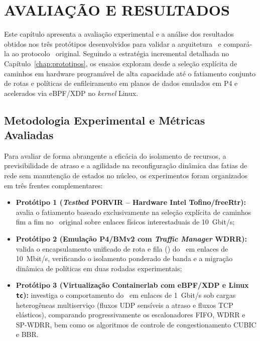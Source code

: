 \chapter{AVALIAÇÃO E RESULTADOS}
\label{chap:avaliacao}

Este capítulo apresenta a avaliação experimental e a análise dos resultados obtidos nos três protótipos desenvolvidos para validar a arquitetura \nome\ e compará-la ao protocolo \polka\ original. Seguindo a estratégia incremental detalhada no Capítulo~\ref{chap:prototipos}, os ensaios exploram desde a seleção explícita de caminhos em hardware programável de alta capacidade até o fatiamento conjunto de rotas e políticas de enfileiramento em planos de dados emulados em P4 e acelerados via eBPF/XDP no \textit{kernel} Linux.

\section{Metodologia Experimental e Métricas Avaliadas}
\label{sec:metodologia_avaliacao}

Para avaliar de forma abrangente a eficácia do isolamento de recursos, a previsibilidade de atraso e a agilidade na reconfiguração dinâmica das fatias de rede sem manutenção de estados no núcleo, os experimentos foram organizados em três frentes complementares:

\begin{itemize}
    \item \textbf{Protótipo 1 (\textit{Testbed} PORVIR -- Hardware Intel Tofino/freeRtr):} avalia o fatiamento baseado exclusivamente na seleção explícita de caminhos fim a fim no \polka\ original sobre enlaces físicos interestaduais de 10~Gbit/s;
    \item \textbf{Protótipo 2 (Emulação P4/BMv2 com \textit{Traffic Manager} WDRR):} valida o encapsulamento unificado de rota e fila (\routeID) do \nome\ em enlaces de 10~Mbit/s, verificando o isolamento ponderado de banda e a migração dinâmica de políticas em duas rodadas experimentais;
    \item \textbf{Protótipo 3 (Virtualização Containerlab com eBPF/XDP e Linux \texttt{tc}):} investiga o comportamento do \nome\ em enlaces de 1~Gbit/s sob cargas heterogêneas multiserviço (fluxos UDP sensíveis a atraso e fluxos TCP elásticos), comparando progressivamente os escalonadores FIFO, WDRR e SP-WDRR, bem como os algoritmos de controle de congestionamento CUBIC e BBR.
\end{itemize}

